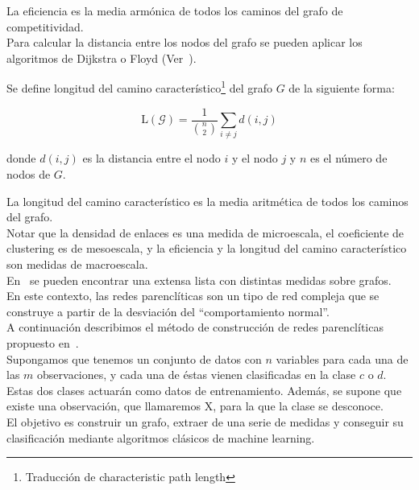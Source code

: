 La eficiencia es la media armónica de todos los caminos del grafo de competitividad.\\

Para calcular la distancia entre los nodos del grafo se pueden aplicar los algoritmos de Dijkstra o Floyd (Ver~\cite{Cormen:2001:IA:580470}).

\begin{defi}
	Se define longitud del camino característico\footnote{Traducción de characteristic path length} del grafo $G$ de la siguiente forma:
	
	\begin{equation}\label{eq:camino}
	\mathrm{L}(\mathcal{G}) = \dfrac{1}{\binom{n}{2}} \sum_{i\neq j} d(i,j)
	\end{equation}
	
	donde $d(i,j)$ es la distancia entre el nodo $i$ y el nodo $j$ y $n$ es el número de nodos de $G$.
\end{defi}

La longitud del camino característico es la media aritmética de todos los caminos del grafo.\\

Notar que la densidad de enlaces es una medida de microescala, el coeficiente de clustering es de mesoescala, y la eficiencia y la longitud del camino característico son medidas de macroescala.\\

En~\cite{cond-mat/0505185} se pueden encontrar una extensa lista con distintas medidas sobre grafos.\\

En este contexto, las redes parenclíticas son un tipo de red compleja que se construye a partir de la desviación del ``comportamiento normal''.\\

A continuación describimos el método de construcción de redes parenclíticas propuesto en~\cite{metabo3010155}.\\

Supongamos que tenemos un conjunto de datos con $n$ variables para cada una de las $m$ observaciones, y cada una de éstas vienen clasificadas en la clase $c$ o $d$. Estas dos clases actuarán como datos de entrenamiento. Además, se supone que existe una observación, que llamaremos X, para la que la clase se desconoce.\\

El objetivo es construir un grafo, extraer de una serie de medidas y conseguir su clasificación mediante algoritmos clásicos de machine learning.\\


